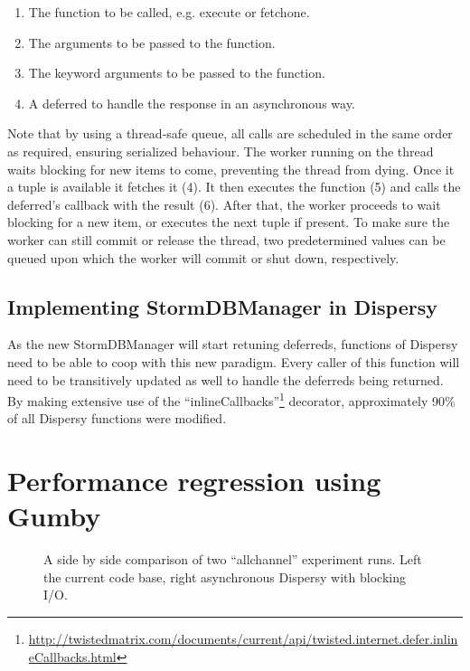 \begin{enumerate}
	\item The function to be called, e.g. execute or fetchone.
	\item The arguments to be passed to the function.
	\item The keyword arguments to be passed to the function.
	\item A deferred to handle the response in an asynchronous way.
\end{enumerate}

Note that by using a thread-safe queue, all calls are scheduled in the same order as required, ensuring serialized behaviour.
The worker running on the thread waits blocking for new items to come, preventing the thread from dying.
Once it a tuple is available it fetches it (4).
It then executes the function (5) and calls the deferred's callback with the result (6).
After that, the worker proceeds to wait blocking for a new item, or executes the next tuple if present.
To make sure the worker can still commit or release the thread, two predetermined values can be queued upon which the worker will commit or shut down, respectively.

\subsection{Implementing StormDBManager in Dispersy}

As the new StormDBManager will start retuning deferreds, functions of Dispersy need to be able to coop with this new paradigm.
Every caller of this function will need to be transitively updated as well to handle the deferreds being returned.
By making extensive use of the \enquote{inlineCallbacks}\footnote{\url{http://twistedmatrix.com/documents/current/api/twisted.internet.defer.inlineCallbacks.html}} decorator, approximately 90\% of all Dispersy functions were modified. 

\section{Performance regression using Gumby}

\begin{figure}[h]
	\caption{A side by side comparison of two \enquote{allchannel} experiment runs. Left the current code base, right asynchronous Dispersy with blocking I/O.}
	\label{fig:side_by_side_send}
\end{figure} 

